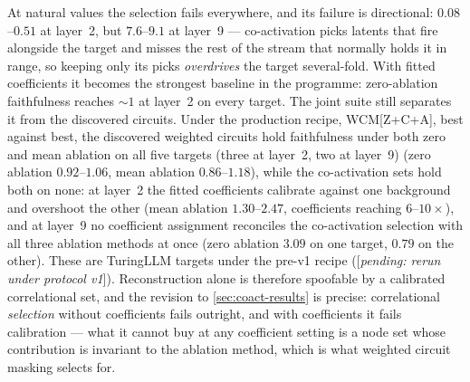 \documentclass[10pt]{article}
\newcommand{\pending}[1]{\textcolor{red!70!black}{[\textit{pending: #1}]}}
\begin{document}
At natural values the selection fails everywhere, and its failure is directional: $0.08$--$0.51$ at layer~2, but $7.6$--$9.1$ at layer~9 --- co-activation picks latents that fire alongside the target and misses the rest of the stream that normally holds it in range, so keeping only its picks \emph{overdrives} the target several-fold.
With fitted coefficients it becomes the strongest baseline in the programme: zero-ablation faithfulness reaches ${\sim}1$ at layer~2 on every target.
The joint suite still separates it from the discovered circuits.
Under the production recipe, WCM[Z+C+A], best against best, the discovered weighted circuits hold faithfulness under both zero and mean ablation on all five targets (three at layer~2, two at layer~9) (zero ablation $0.92$--$1.06$, mean ablation $0.86$--$1.18$), while the co-activation sets hold both on none: at layer~2 the fitted coefficients calibrate against one background and overshoot the other (mean ablation $1.30$--$2.47$, coefficients reaching $6$--$10\times$), and at layer~9 no coefficient assignment reconciles the co-activation selection with all three ablation methods at once (zero ablation $3.09$ on one target, $0.79$ on the other).
These are TuringLLM targets under the pre-v1 recipe (\pending{rerun under protocol v1}).
Reconstruction alone is therefore spoofable by a calibrated correlational set, and the revision to \cref{sec:coact-results} is precise: correlational \emph{selection} without coefficients fails outright, and with coefficients it fails calibration --- what it cannot buy at any coefficient setting is a node set whose contribution is invariant to the ablation method, which is what weighted circuit masking selects for.
\end{document}
